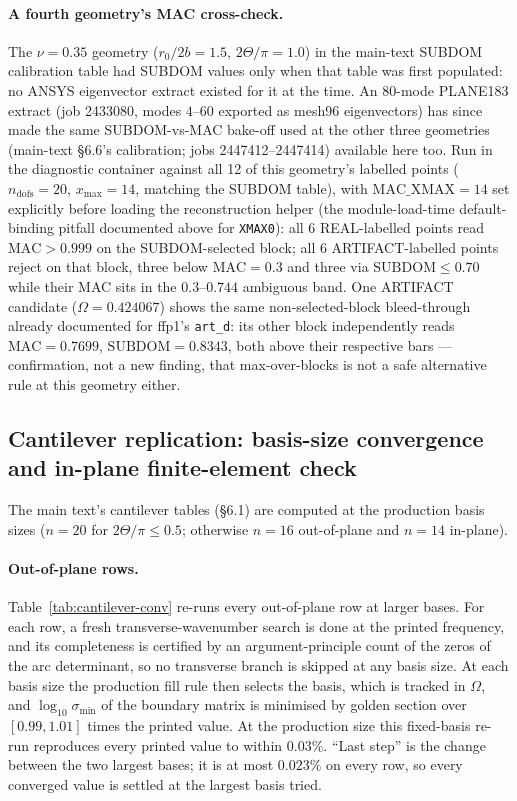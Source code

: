 \documentclass[11pt]{article}
\begin{document}
\paragraph{A fourth geometry's MAC cross-check.} The $\nu=0.35$
geometry ($r_0/2b=1.5$, $2\Theta/\pi=1.0$) in the main-text SUBDOM
calibration table had SUBDOM values only when that table was first
populated: no ANSYS eigenvector extract existed for it at the time.
An 80-mode PLANE183 extract (job 2433080, modes $4$--$60$ exported as
mesh96 eigenvectors) has since made the same SUBDOM-vs-MAC bake-off
used at the other three geometries (main-text §6.6's
calibration; jobs 2447412--2447414) available here too. Run in the
diagnostic container against all 12 of this geometry's labelled
points ($n_{\mathrm{dofs}}=20$, $x_{\max}=14$, matching the SUBDOM
table), with $\mathrm{MAC\_XMAX}=14$ set explicitly before loading the
reconstruction helper (the module-load-time default-binding pitfall
documented above for \texttt{XMAX0}): all 6 REAL-labelled points read
$\mathrm{MAC}>0.999$ on the SUBDOM-selected block; all 6
ARTIFACT-labelled points reject on that block, three below
$\mathrm{MAC}=0.3$ and three via $\mathrm{SUBDOM}\le0.70$ while their
MAC sits in the $0.3$--$0.744$ ambiguous band. One ARTIFACT candidate
($\Omega=0.424067$) shows the same non-selected-block bleed-through
already documented for ffp1's \texttt{art\_d}: its other block
independently reads $\mathrm{MAC}=0.7699$, $\mathrm{SUBDOM}=0.8343$,
both above their respective bars --- confirmation, not a new finding,
that max-over-blocks is not a safe alternative rule at this geometry
either.

\subsection{Cantilever replication: basis-size convergence and in-plane finite-element check}\label{sec:cantilever-conv}
The main text's cantilever tables (\S6.1) are computed at the production
basis sizes ($n=20$ for $2\Theta/\pi\le0.5$; otherwise $n=16$
out-of-plane and $n=14$ in-plane).

\paragraph{Out-of-plane rows.} Table~\ref{tab:cantilever-conv} re-runs
every out-of-plane row at larger bases. For each row, a fresh
transverse-wavenumber search is done at the printed frequency, and its
completeness is certified by an argument-principle count of the zeros
of the arc determinant, so no transverse branch is skipped at any basis
size. At each
basis size the production fill rule then selects the basis, which is
tracked in $\Omega$, and $\log_{10}\sigma_{\min}$ of the boundary matrix
is minimised by golden section over $[0.99,1.01]$ times the printed
value. At the production size this fixed-basis re-run reproduces every
printed value to within $0.03\%$. ``Last step'' is the change between
the two largest bases; it is at most $0.023\%$ on every row, so every
converged value is settled at the largest basis tried.
\end{document}

